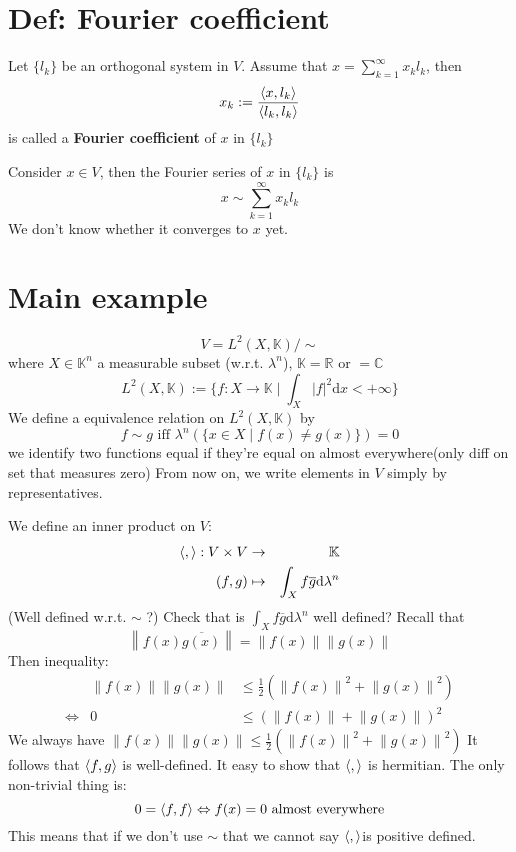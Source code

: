 \documentclass{book}
\newcommand{\abs}[1]{\left\lvert #1 \right\rvert}
\newcommand{\norm}[1]{\left\lVert #1 \right\rVert}
\begin{document}
\section{Def: Fourier coefficient}
Let $\{l_k\}$ be an orthogonal system in $V$. Assume that $x=\sum\limits_{k=1}^\infty x_kl_k$, then $$x_k:=\frac{\left<x,l_k\right>}{\left<l_k,l_k\right>}$$
is called a \textbf{Fourier coefficient} of $x$ in $\{l_k\}$

Consider $x\in V$, then the Fourier series of $x$ in $\{l_k\}$ is $$x\sim\sum\limits_{k=1}^\infty x_k l_k$$
We don't know whether it converges to $x$ yet.
\section{Main example}
$$V=L^2(X,\mathbb{K})/\sim$$
where $X\in \mathbb{K}^n$ a measurable subset (w.r.t. $\lambda^n$), $\mathbb{K}=\mathbb{R}\text{ or }=\mathbb{C}$
$$L^2(X,\mathbb{K}):=\{f:X\rightarrow \mathbb{K}\mid \int_X\abs{f}^2\text{d}x<+\infty\}$$
We define a equivalence relation on $L^2(X,\mathbb{K})$ by$$f\sim g\text{ iff }\lambda^n\left(\{x\in X\mid f(x)\neq g(x)\}\right)=0$$
we identify two functions equal if they're equal on almost everywhere(only diff on set that measures zero) From now on, we write elements in $V$ simply by representatives.

We define an inner product on $V$:
$$\begin{aligned}
    \left<,\right>:V\times V &\rightarrow &\mathbb{K}\\
    (f,g)&\mapsto&\int_Xf\overline g\text{d}\lambda^n
\end{aligned}$$
(Well defined w.r.t. $\sim$ ?) Check that is $\int_Xf\overline{g}\text{d}\lambda^n$ well defined? Recall that$$\norm{f(x)\overline{g(x)}}=\norm{f(x)}\norm{g(x)}$$ Then inequality:
$$\begin{aligned}
    &\norm{f(x)}\norm{g(x)}&\leq\frac{1}{2}(\norm{f(x)}^2+\norm{g(x)}^2)\\
    \Leftrightarrow&0&\leq(\norm{f(x)}+\norm{g(x)})^2
\end{aligned}$$
We always have $\norm{f(x)}\norm{g(x)}\leq\frac{1}{2}(\norm{f(x)}^2+\norm{g(x)}^2)$ It follows that $\left<f,g\right>$ is well-defined. It easy to show that $\left<,\right>$ is hermitian. The only non-trivial thing is:
$$0=\left<f,f\right>\Leftrightarrow f(x)=0\text{ almost everywhere}$$
This means that if we don't use $\sim$ that we cannot say $\left<,\right> $is positive defined.
\end{document}
